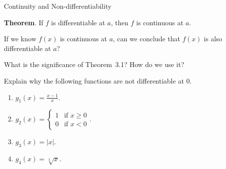 \documentclass[../main.tex]{subfiles}
\begin{document}
\begin{lesson}{Continuity and Non-differentiability}
  \begin{mdframed}[style=withref-compact] \label{thm:differentiability-implies-continuity}
    \textbf{Theorem}. If \(f\) is {differentiable} at \(a\), then \(f\) is {continuous} at \(a\).

  \end{mdframed}

  \faComment{} If we know \(f(x)\) is continuous at \(a\), can we conclude that \(f(x)\) is also differentiable at \(a\)?

  \faComment{} What is the significance of Theorem~3.1? How do we use it?

  \begin{example}
    Explain why the following functions are not differentiable at \(0\).

    \begin{enumerate}[wide]
      \item \(g_{1}(x) = \frac{x - 1}{x}\).

      \item \(g_{2}(x) = \begin{cases} 1 &\text{if } x \ge 0 \\ 0 &\text{if } x < 0 \end{cases}\).

      \item \(g_{3}(x) = |x|\).

      \item \(g_{4}(x) = \sqrt[3]{x}\). 

    \end{enumerate}
  \end{example}

  \clearpage


\end{lesson}
\end{document}
